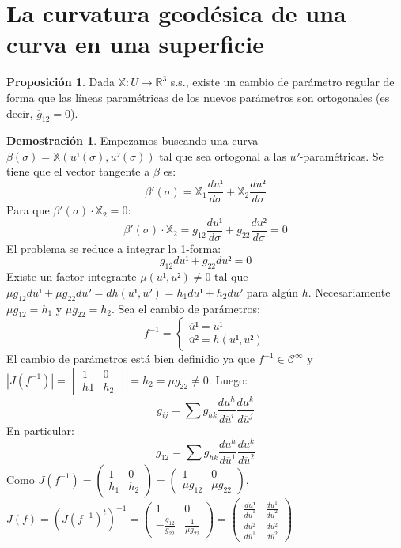 \documentclass[twoside]{report}
\theoremstyle{definition}
\newtheorem{prop}[theorem]{Proposición}
\newtheorem*{dem}{Demostración}
\numberwithin{equation}{section}
\newcommand{\R}{\mathbb{R}}
\newcommand{\X}{\mathbb{X}}
\begin{document}
\section{La curvatura geodésica de una curva en una superficie}

\begin{prop}
Dada $\X : U \to \R^3$ s.s., existe un cambio de parámetro regular de forma que las líneas paramétricas de los nuevos parámetros son ortogonales (es decir, $\overline{g}_{12}=0$).
\end{prop}

\begin{dem}
Empezamos buscando una curva $β(σ)=\X(u¹(σ),u²(σ))$ tal que sea ortogonal a las $u²$-paramétricas. Se tiene que el vector tangente a $β$ es:
\[ β'(σ) = \X_1 \frac{du¹}{dσ}+\X_2 \frac{du²}{dσ} \]
Para que $β'(σ) \cdot \X_2 = 0$:
\[ β'(σ) \cdot \X_2 = g_{12} \frac{du¹}{dσ} + g_{22} \frac{du²}{dσ} = 0 \]
El problema se reduce a integrar la 1-forma:
\[ g_{12} du¹ + g_{22} du² = 0 \]
Existe un factor integrante $μ(u¹,u²)\neq 0$ tal que $μ g_{12} du¹+μ g_{22} du² = dh(u¹,u²)=h_1 du¹+h_2 du²$ para algún $h$. Necesariamente $μ g_{12} = h_1$ y $μ g_{22} = h_2$. Sea el cambio de parámetros:
\[ f^{-1} = \begin{cases}
	\overline{u}¹ = u¹\\
	\overline{u}² = h(u¹,u²)
\end{cases}\]
El cambio de parámetros está bien definidio ya que $f^{-1} \in \mathcal{C}^\infty$ y $|J(f^{-1})| = \begin{vmatrix}1 & 0\\h1 & h_2\end{vmatrix} = h_2 = μ g_{22} \neq 0$. Luego:
\[ \overline{g}_{ij} = \sum g_{hk} \frac{du^h}{d\overline{u}^i} \frac{du^k}{d\overline{u}^j}\]
En particular:
\[ \overline{g}_{12} = \sum g_{hk} \frac{du^h}{d\overline{u}^1} \frac{du^k}{d\overline{u}^2} \]
Como $J(f^{-1}) = \begin{pmatrix}1 & 0\\h_1 & h_2\end{pmatrix} = \begin{pmatrix}1 & 0\\μ g_{12} & μ g_{22}\end{pmatrix}$, $J(f) = (J(f^{-1})^t)^{-1} = \begin{pmatrix}1 & 0 \\ -\frac{g_{12}}{g_{22}} & \frac{1}{μg_{22}}\end{pmatrix} = \begin{pmatrix}\frac{du¹}{d\overline{u}^1} & \frac{du^1}{d\overline{u}^2}\\\frac{du^2}{d\overline{u}^1} & \frac{du^2}{d\overline{u}^2}\end{pmatrix}$

\end{dem}
\end{document}
